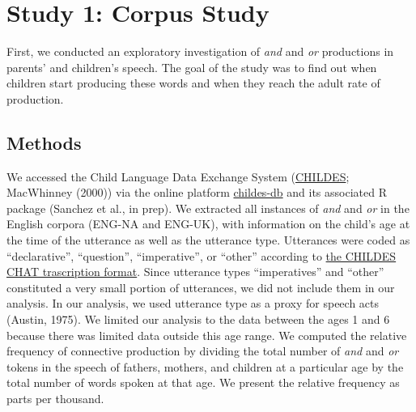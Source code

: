 \documentclass[10pt, letterpaper]{article}
\begin{document}
\section{Study 1: Corpus Study}\label{study-1-corpus-study}

First, we conducted an exploratory investigation of \emph{and} and
\emph{or} productions in parents' and children's speech. The goal of the
study was to find out when children start producing these words and when
they reach the adult rate of production.

\subsection{Methods}\label{methods}

We accessed the Child Language Data Exchange System
(\href{https://childes.talkbank.org/}{CHILDES}; MacWhinney (2000)) via
the online platform \href{http://childes-db.stanford.edu/}{childes-db}
and its associated R package (Sanchez et al., in prep). We extracted all
instances of \emph{and} and \emph{or} in the English corpora (ENG-NA and
ENG-UK), with information on the child's age at the time of the
utterance as well as the utterance type. Utterances were coded as
``declarative'', ``question'', ``imperative'', or ``other'' according to
\href{https://talkbank.org/manuals/CHAT.html\#_Toc486414422}{the CHILDES
CHAT trascription format}. Since utterance types ``imperatives'' and
``other'' constituted a very small portion of utterances, we did not
include them in our analysis. In our analysis, we used utterance type as
a proxy for speech acts (Austin, 1975). We limited our analysis to the
data between the ages 1 and 6 because there was limited data outside
this age range. We computed the relative frequency of connective
production by dividing the total number of \emph{and} and \emph{or}
tokens in the speech of fathers, mothers, and children at a particular
age by the total number of words spoken at that age. We present the
relative frequency as parts per thousand.
\end{document}
